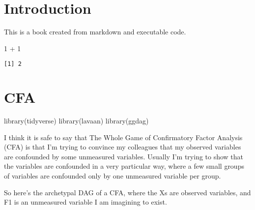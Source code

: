 \documentclass[
  letterpaper,
  DIV=11,
  numbers=noendperiod]{scrreprt}
\newenvironment{Shaded}{\begin{snugshade}}{\end{snugshade}}
\newcommand{\DecValTok}[1]{\textcolor[rgb]{0.68,0.00,0.00}{#1}}
\newcommand{\FunctionTok}[1]{\textcolor[rgb]{0.28,0.35,0.67}{#1}}
\newcommand{\NormalTok}[1]{\textcolor[rgb]{0.00,0.23,0.31}{#1}}
\newcommand{\SpecialCharTok}[1]{\textcolor[rgb]{0.37,0.37,0.37}{#1}}
\begin{document}

\hypertarget{introduction}{%
\chapter{Introduction}\label{introduction}}

This is a book created from markdown and executable code.

\begin{Shaded}
\begin{Highlighting}[]
\DecValTok{1} \SpecialCharTok{+} \DecValTok{1}
\end{Highlighting}
\end{Shaded}

\begin{verbatim}
[1] 2
\end{verbatim}


\hypertarget{cfa}{%
\chapter{CFA}\label{cfa}}

\begin{Shaded}
\begin{Highlighting}[]
\FunctionTok{library}\NormalTok{(tidyverse)}
\FunctionTok{library}\NormalTok{(lavaan)}
\FunctionTok{library}\NormalTok{(ggdag)}
\end{Highlighting}
\end{Shaded}

I think it is safe to say that The Whole Game of Confirmatory Factor
Analysis (CFA) is that I'm trying to convince my colleagues that my
observed variables are confounded by some unmeasured variables. Usually
I'm trying to show that the variables are confounded in a very
particular way, where a few small groups of variables are confounded
only by one unmeasured variable per group.

So here's the archetypal DAG of a CFA, where the Xs are observed
variables, and F1 is an unmeasured variable I am imagining to exist.
\end{document}
